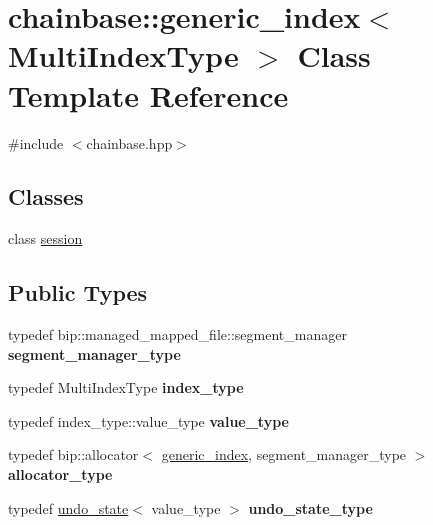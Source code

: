\hypertarget{classchainbase_1_1generic__index}{}\section{chainbase\+:\+:generic\+\_\+index$<$ Multi\+Index\+Type $>$ Class Template Reference}
\label{classchainbase_1_1generic__index}


{\ttfamily \#include $<$chainbase.\+hpp$>$}

\subsection*{Classes}
\begin{DoxyCompactItemize}
\item 
class \mbox{\hyperlink{classchainbase_1_1generic__index_1_1session}{session}}
\end{DoxyCompactItemize}
\subsection*{Public Types}
\begin{DoxyCompactItemize}
\item 
\mbox{\label{classchainbase_1_1generic__index_a25122d0cbd45393c46a29a120232d26e}} 
typedef bip\+::managed\+\_\+mapped\+\_\+file\+::segment\+\_\+manager {\bfseries segment\+\_\+manager\+\_\+type}
\item 
\mbox{\label{classchainbase_1_1generic__index_a3274a93de82f9816ca963e313fbc5c61}} 
typedef Multi\+Index\+Type {\bfseries index\+\_\+type}
\item 
\mbox{\label{classchainbase_1_1generic__index_a50db372d6ec22d91da066d65a1c685ed}} 
typedef index\+\_\+type\+::value\+\_\+type {\bfseries value\+\_\+type}
\item 
\mbox{\label{classchainbase_1_1generic__index_a762fcd823dfe669a5bef009e9385d2d7}} 
typedef bip\+::allocator$<$ \mbox{\hyperlink{classchainbase_1_1generic__index}{generic\+\_\+index}}, segment\+\_\+manager\+\_\+type $>$ {\bfseries allocator\+\_\+type}
\item 
\mbox{\label{classchainbase_1_1generic__index_a4eac9fd01f8c4c4d47ace04b85bd7c14}} 
typedef \mbox{\hyperlink{classchainbase_1_1undo__state}{undo\+\_\+state}}$<$ value\+\_\+type $>$ {\bfseries undo\+\_\+state\+\_\+type}
\end{DoxyCompactItemize}
